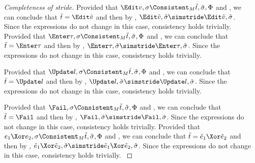 \begin{proof}[Completeness of stride]






  {
    Provided that $\Edit v,\sigma\Consistent_M\tilde{t},\tilde{\sigma},\Phi$ and ,
    we can conclude that $\tilde{t}=\Edit\tilde{v}$ and then by , $\Edit\tilde{v},\tilde{\sigma}\simstride\Edit\tilde{v},\tilde{\sigma}$.
    Since the  expressions do not change in this case, consistency holds trivially.
   }
  {
  Provided that $\Enter\tau ,\sigma\Consistent_M\tilde{t},\tilde{\sigma},\Phi$ and ,
  we can conclude that $\tilde{t}=\Enter\tau$ and then by , $\Enter\tau,\tilde{\sigma}\simstride\Enter\tau,\tilde{\sigma}$.
  Since the  expressions do not change in this case, consistency holds trivially.
  }

   {
   Provided that $\Update l,\sigma\Consistent_M\tilde{t},\tilde{\sigma},\Phi$ and ,
   we can conclude that $\tilde{t}=\Update l$ and then by , $\Update l,\tilde{\sigma}\simstride\Update l,\tilde{\sigma}$.
   Since the  expressions do not change in this case, consistency holds trivially.
  }

   {
   Provided that $\Fail,\sigma\Consistent_M\tilde{t},\tilde{\sigma},\Phi$ and ,
   we can conclude that $\tilde{t}=\Fail$ and then by , $\Fail,\tilde{\sigma}\simstride\Fail,\tilde{\sigma}$.
   Since the  expressions do not change in this case, consistency holds trivially.
   }
   {
   Provided that $e_1\Xor e_2,\sigma\Consistent_M\tilde{t},\tilde{\sigma},\Phi$ and ,
   we can conclude that $\tilde{t}=\tilde{e}_1\Xor \tilde{e}_2$ and then by , $\tilde{e}_1\Xor \tilde{e}_2,\tilde{\sigma}\simstride\tilde{e}_1\Xor \tilde{e}_2,\tilde{\sigma}$.
   Since the  expressions do not change in this case, consistency holds trivially.
   }





\end{proof}
